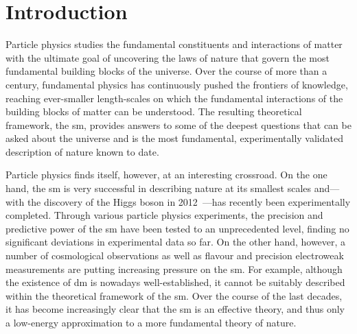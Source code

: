 
\chapter*{Introduction}

\ifpdf
    \graphicspath{{Chapter1/Figs/Raster/}{Chapter1/Figs/PDF/}{Chapter1/Figs/}}
\else
    \graphicspath{{Chapter1/Figs/Vector/}{Chapter1/Figs/}}
\fi

Particle physics studies the fundamental constituents and interactions of matter with the ultimate goal of uncovering the laws of nature that govern the most fundamental building blocks of the universe.
Over the course of more than a century, fundamental physics has continuously pushed the frontiers of knowledge, reaching ever-smaller length-scales on which the fundamental interactions of the building blocks of matter can be understood.
The resulting theoretical framework, the \gls{sm}, provides answers to some of the deepest questions that can be asked about the universe and is the most fundamental, experimentally validated description of nature known to date. 

Particle physics finds itself, however, at an interesting crossroad. On the one hand, the \gls{sm} is very successful in describing nature at its smallest scales and---with the discovery of the Higgs boson in 2012~\cite{HIGG-2012-27,CMS-HIG-12-028}---has recently been experimentally completed.
Through various particle physics experiments, the precision and predictive power of the \gls{sm} have been tested to an unprecedented level, finding no significant deviations in experimental data so far.
On the other hand, however, a number of cosmological observations as well as flavour and precision electroweak measurements are putting increasing pressure on the \gls{sm}.
For example, although the existence of \gls{dm} is nowadays well-established, it cannot be suitably described within the theoretical framework of the \gls{sm}.
Over the course of the last decades, it has become increasingly clear that the \gls{sm} is an effective theory, and thus only a low-energy approximation to a more fundamental theory of nature.

